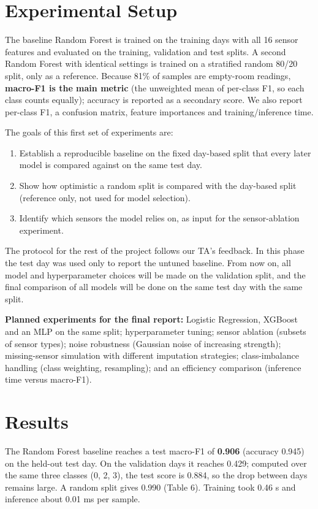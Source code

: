 \documentclass[12pt,a4paper]{article}
\begin{document}
\section{Experimental Setup}
The baseline Random Forest is trained on the training days with all 16 sensor features and evaluated on the training, validation and test splits. A second Random Forest with identical settings is trained on a stratified random 80/20 split, only as a reference. Because 81\% of samples are empty-room readings, \textbf{macro-F1 is the main metric} (the unweighted mean of per-class F1, so each class counts equally); accuracy is reported as a secondary score. We also report per-class F1, a confusion matrix, feature importances and training/inference time.

The goals of this first set of experiments are:

\begin{enumerate}
  \item Establish a reproducible baseline on the fixed day-based split that every later model is compared against on the same test day.
  \item Show how optimistic a random split is compared with the day-based split (reference only, not used for model selection).
  \item Identify which sensors the model relies on, as input for the sensor-ablation experiment.
\end{enumerate}

The protocol for the rest of the project follows our TA's feedback. In this phase the test day was used only to report the untuned baseline. From now on, all model and hyperparameter choices will be made on the validation split, and the final comparison of all models will be done on the same test day with the same split.

\textbf{Planned experiments for the final report:} Logistic Regression, XGBoost and an MLP on the same split; hyperparameter tuning; sensor ablation (subsets of sensor types); noise robustness (Gaussian noise of increasing strength); missing-sensor simulation with different imputation strategies; class-imbalance handling (class weighting, resampling); and an efficiency comparison (inference time versus macro-F1).

\section{Results}
The Random Forest baseline reaches a test macro-F1 of \textbf{0.906} (accuracy 0.945) on the held-out test day. On the validation days it reaches 0.429; computed over the same three classes (0, 2, 3), the test score is 0.884, so the drop between days remains large. A random split gives 0.990 (Table 6). Training took 0.46 s and inference about 0.01 ms per sample.
\end{document}
